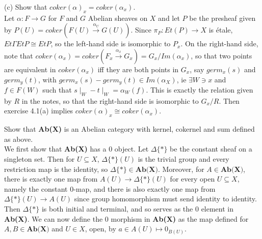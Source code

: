 (c) Show that $coker(\alpha)_x = coker(\alpha_x)$.\\

Let $\alpha: F \rightarrow G$ for $F$ and $G$ Abelian sheaves on $X$ and let $P$ be the presheaf given by $P(U)=coker(F(U) \xrightarrow{\alpha_U} G(U))$. Since $\pi_P: Et(P) \rightarrow X$ is \'etale, $Et\Gamma EtP \cong EtP$, so the left-hand side is isomorphic to $P_x$. On the right-hand side, note that $coker(\alpha_x)=coker(F_x \xrightarrow{\alpha_x} G_x) = G_x/Im(\alpha_x)$, so that two points are equivalent in $coker(\alpha_x)$ iff they are both points in $G_x$, say $germ_x(s)$ and $germ_y(t)$, with $germ_x(s) - germ_y(t) \in Im(\alpha_X)$, ie $\exists W \ni x$ and $f \in F(W)$ such that $s\mid_W - t\mid_W = \alpha_W(f)$. This is exactly the relation given by $R$ in the notes, so that the right-hand side is isomorphic to $G_x/R$. Then exercise 4.1(a) implies $coker(\alpha)_x \cong coker(\alpha_x)$.

 Show that \textbf{Ab(X)} is an Abelian category with kernel, cokernel and sum defined as above.\\

We first show that \textbf{Ab(X)} has a $0$ object. Let $\Delta \{*\}$ be the constant sheaf on a singleton set. Then for $U \subseteq X$,  $\Delta \{*\}(U)$ is the trivial group and every restriction map is the identity, so $\Delta \{*\} \in \textbf{Ab(X)}$. Moreover, for $A \in \textbf{Ab(X)}$, there is exactly one map from $A(U) \rightarrow \Delta \{*\}(U)$ for every open $U \subseteq X$, namely the constant $0$-map, and there is also exactly one map from $\Delta \{*\}(U) \rightarrow A(U)$ since group homomorphism must send identity to identity. Then $\Delta \{*\}$ is both initial and terminal, and so serves as the $0$ element in \textbf{Ab(X)}. We can now define the $0$ morphism in \textbf{Ab(X)} as the map defined for $A,B \in \textbf{Ab(X)}$ and $U \in X$, open, by $a \in A(U) \mapsto 0_{B(U)}$.\\

